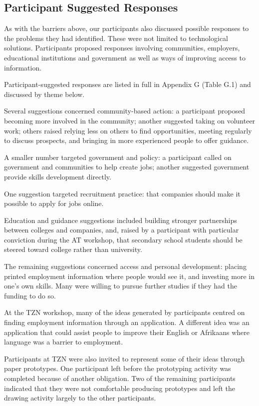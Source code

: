 \subsection{Participant Suggested Responses}
\label{sec:suggested-responses}

As with the barriers above, our participants also discussed possible responses to the problems they had identified. These were not limited to technological solutions. Participants proposed responses involving communities, employers, educational institutions and government as well as ways of improving access to information.

Participant-suggested responses are listed in full in Appendix G (Table G.1) and discussed by theme below.

Several suggestions concerned community-based action: a participant proposed becoming more involved in the community; another suggested taking on volunteer work; others raised relying less on others to find opportunities, meeting regularly to discuss prospects, and bringing in more experienced people to offer guidance.

A smaller number targeted government and policy: a participant called on government and communities to help create jobs; another suggested government provide skills development directly.

One suggestion targeted recruitment practice: that companies should make it possible to apply for jobs online.

Education and guidance suggestions included building stronger partnerships between colleges and companies, and, raised by a participant with particular conviction during the AT workshop, that secondary school students should be steered toward college rather than university.

The remaining suggestions concerned access and personal development: placing printed employment information where people would see it, and investing more in one's own skills. Many were willing to pursue further studies if they had the funding to do so.

At the TZN workshop, many of the ideas generated by participants centred on finding employment information through an application. A different idea was an application that could assist people to improve their English or Afrikaans where language was a barrier to employment.

Participants at TZN were also invited to represent some of their ideas through paper prototypes. One participant left before the prototyping activity was completed because of another obligation. Two of the remaining participants indicated that they were not comfortable producing prototypes and left the drawing activity largely to the other participants.


